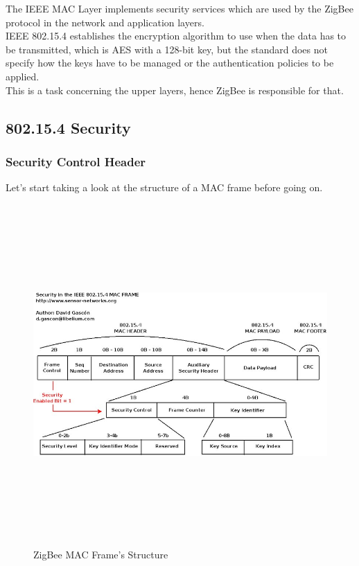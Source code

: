 \documentclass[12pt]{report}
\begin{document}
{The IEEE MAC Layer implements security services which are used by the ZigBee protocol in the network and application layers.\\ 
IEEE 802.15.4 establishes the encryption algorithm to use when the data has to be transmitted, which is AES with a 128-bit key, but the standard does not specify how the keys have to be managed or the authentication policies to be applied.\\
This is a task concerning the upper layers, hence ZigBee is responsible for that.

\subsection{802.15.4 Security}
\bigskip

\subsubsection{Security Control Header}
\bigskip
Let's start taking a look at the structure of a MAC frame before going on.\\

\begin{figure}[H]
\includegraphics[width=13cm,height=13cm,keepaspectratio]{mac_frame}
\centering
\caption{ZigBee MAC Frame's Structure}
\end{figure}

}
\end{document}
